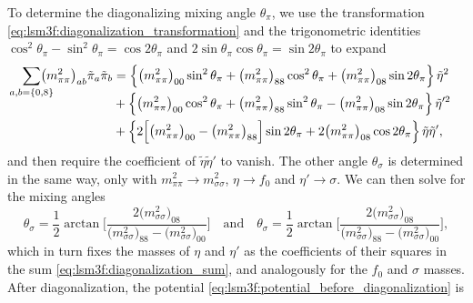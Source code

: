 To determine the diagonalizing mixing angle $\theta_\pi$,
we use the transformation \eqref{eq:lsm3f:diagonalization_transformation} and the trigonometric identities $\cos^2 \theta_\pi - \sin^2 \theta_\pi = \cos 2 \theta_\pi$ and $2 \sin\theta_\pi \cos\theta_\pi = \sin 2 \theta_\pi$ to expand
\begin{equation}
\begin{split}
	\smash{\smashoperator{\sum_{a,b=\{0,8\}}}} \big(m^2_{\pi\pi}\big)_{ab} \tilde{\pi}_a \tilde{\pi}_b &= \Big\{ \big(m^2_{\pi\pi}\big)_{00} \sin^2 \theta_\pi + \big(m^2_{\pi\pi}\big)_{88} \cos^2 \theta_\pi + \big(m^2_{\pi\pi}\big)_{08} \sin 2 \theta_\pi \Big\} \, \tilde{\eta}^2 \\
	                                                                                                   &+ \Big\{ \big(m^2_{\pi\pi}\big)_{00} \cos^2 \theta_\pi + \big(m^2_{\pi\pi}\big)_{88} \sin^2 \theta_\pi - \big(m^2_{\pi\pi}\big)_{08} \sin 2 \theta_\pi \Big\} \, \tilde{\eta}'^2 \\
	                                                                                                   &+ \Big\{ 2 \Big[ \big(m^2_{\pi\pi}\big)_{00} - \big(m^2_{\pi\pi}\big)_{88} \Big] \sin 2 \theta_\pi + 2 \big(m^2_{\pi\pi}\big)_{08} \cos 2 \theta_\pi \Big\} \, \tilde{\eta} \tilde{\eta}' ,
\end{split}
\label{eq:lsm3f:diagonalization_sum}
\end{equation}
and then require the coefficient of $\tilde{\eta} \tilde{\eta}'$ to vanish.
The other angle $\theta_\sigma$ is determined in the same way, only with $m^2_{\pi\pi} \rightarrow m^2_{\sigma\sigma}$, $\eta \rightarrow f_0$ and $\eta' \rightarrow \sigma$.
We can then solve for the mixing angles
\begin{equation}
	\theta_\sigma = \frac12 \arctan \Bigg[ \frac{2\big(m^2_{\sigma\sigma}\big)_{08}}{\big(m^2_{\sigma\sigma}\big)_{88} - \big(m^2_{\sigma\sigma}\big)_{00}} \Bigg]
	\quad \text{and} \quad
	\theta_\sigma = \frac12 \arctan \Bigg[ \frac{2\big(m^2_{\sigma\sigma}\big)_{08}}{\big(m^2_{\sigma\sigma}\big)_{88} - \big(m^2_{\sigma\sigma}\big)_{00}} \Bigg],
\label{eq:lsm3f:mixing_angles}
\end{equation}
which in turn fixes the masses of $\eta$ and $\eta'$ as the coefficients of their squares in the sum \eqref{eq:lsm3f:diagonalization_sum}, and analogously for the $f_0$ and $\sigma$ masses.
After diagonalization, the potential \eqref{eq:lsm3f:potential_before_diagonalization}  is
